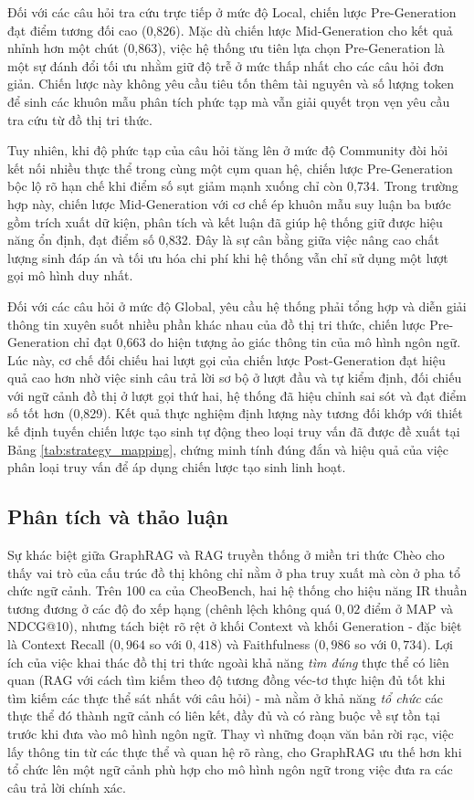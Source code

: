 Đối với các câu hỏi tra cứu trực tiếp ở mức độ Local, chiến lược Pre-Generation đạt điểm tương đối cao (0,826). Mặc dù chiến lược Mid-Generation cho kết quả nhỉnh hơn một chút (0,863), việc hệ thống ưu tiên lựa chọn Pre-Generation là một sự đánh đổi tối ưu nhằm giữ độ trễ ở mức thấp nhất cho các câu hỏi đơn giản. Chiến lược này không yêu cầu tiêu tốn thêm tài nguyên và số lượng token để sinh các khuôn mẫu phân tích phức tạp mà vẫn giải quyết trọn vẹn yêu cầu tra cứu từ đồ thị tri thức.

Tuy nhiên, khi độ phức tạp của câu hỏi tăng lên ở mức độ Community đòi hỏi kết nối nhiều thực thể trong cùng một cụm quan hệ, chiến lược Pre-Generation bộc lộ rõ hạn chế khi điểm số sụt giảm mạnh xuống chỉ còn 0,734. Trong trường hợp này, chiến lược Mid-Generation với cơ chế ép khuôn mẫu suy luận ba bước gồm trích xuất dữ kiện, phân tích và kết luận đã giúp hệ thống giữ được hiệu năng ổn định, đạt điểm số 0,832. Đây là sự cân bằng giữa việc nâng cao chất lượng sinh đáp án và tối ưu hóa chi phí khi hệ thống vẫn chỉ sử dụng một lượt gọi mô hình duy nhất.

Đối với các câu hỏi ở mức độ Global, yêu cầu hệ thống phải tổng hợp và diễn giải thông tin xuyên suốt nhiều phần khác nhau của đồ thị tri thức, chiến lược Pre-Generation chỉ đạt 0,663 do hiện tượng ảo giác thông tin của mô hình ngôn ngữ. Lúc này, cơ chế đối chiếu hai lượt gọi của chiến lược Post-Generation đạt hiệu quả cao hơn nhờ việc sinh câu trả lời sơ bộ ở lượt đầu và tự kiểm định, đối chiếu với ngữ cảnh đồ thị ở lượt gọi thứ hai, hệ thống đã hiệu chỉnh sai sót và đạt điểm số tốt hơn (0,829). Kết quả thực nghiệm định lượng này tương đối khớp với thiết kế định tuyến chiến lược tạo sinh tự động theo loại truy vấn đã được đề xuất tại Bảng \ref{tab:strategy_mapping}, chứng minh tính đúng đắn và hiệu quả của việc phân loại truy vấn để áp dụng chiến lược tạo sinh linh hoạt.

\subsection{Phân tích và thảo luận}
\label{sec:benchmark_discussion}

Sự khác biệt giữa GraphRAG và RAG truyền thống ở miền tri thức Chèo cho thấy vai trò của cấu trúc đồ thị không chỉ nằm ở pha truy xuất mà còn ở pha tổ chức ngữ cảnh. Trên 100 ca của CheoBench, hai hệ thống cho hiệu năng IR thuần tương đương ở các độ đo xếp hạng (chênh lệch không quá $0,02$ điểm ở MAP và NDCG@10), nhưng tách biệt rõ rệt ở khối Context và khối Generation - đặc biệt là Context Recall ($0,964$ so với $0,418$) và Faithfulness ($0,986$ so với $0,734$). Lợi ích của việc khai thác đồ thị tri thức ngoài khả năng \textit{tìm đúng} thực thể có liên quan (RAG với cách tìm kiếm theo độ tương đồng véc-tơ thực hiện đủ tốt khi tìm kiếm các thực thể sát nhất với câu hỏi) - mà nằm ở khả năng \textit{tổ chức} các thực thể đó thành ngữ cảnh có liên kết, đầy đủ và có ràng buộc về sự tồn tại trước khi đưa vào mô hình ngôn ngữ. Thay vì những đoạn văn bản rời rạc, việc lấy thông tin từ các thực thể và quan hệ rõ ràng, cho GraphRAG ưu thế hơn khi tổ chức lên một ngữ cảnh phù hợp cho mô hình ngôn ngữ trong việc đưa ra các câu trả lời chính xác.

